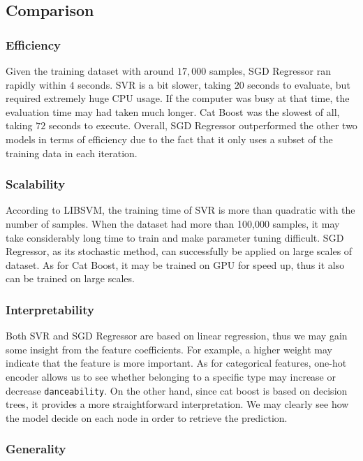 \documentclass[10pt,letterpaper]{article}
\begin{document}
\subsection{Comparison}

\subsubsection{Efficiency}

Given the training dataset with around $17,000$ samples, SGD Regressor ran rapidly within $4$ seconds. SVR is a bit slower, taking $20$ seconds to evaluate, but required extremely huge CPU usage. If the computer was busy at that time, the evaluation time may had taken much longer. Cat Boost was the slowest of all, taking $72$ seconds to execute. Overall, SGD Regressor outperformed the other two models in terms of efficiency due to the fact that it only uses a subset of the training data in each iteration. 

\subsubsection{Scalability}

According to LIBSVM, the training time of SVR is more than quadratic with the number of samples. When the dataset had more than 100,000 samples, it may take considerably long time to train and make parameter tuning difficult. SGD Regressor, as its stochastic method, can successfully be applied on large scales of dataset. As for Cat Boost, it may be trained on GPU for speed up, thus it also can be trained on large scales. 

\subsubsection{Interpretability}

Both SVR and SGD Regressor are based on linear regression, thus we may gain some insight from the feature coefficients. For example, a higher weight may indicate that the feature is more important. As for categorical features, one-hot encoder allows us to see whether belonging to a specific type may increase or decrease \texttt{danceability}. On the other hand, since cat boost is based on decision trees, it provides a more straightforward interpretation. We may clearly see how the model decide on each node in order to retrieve the prediction. 

\subsubsection{Generality}
\end{document}
